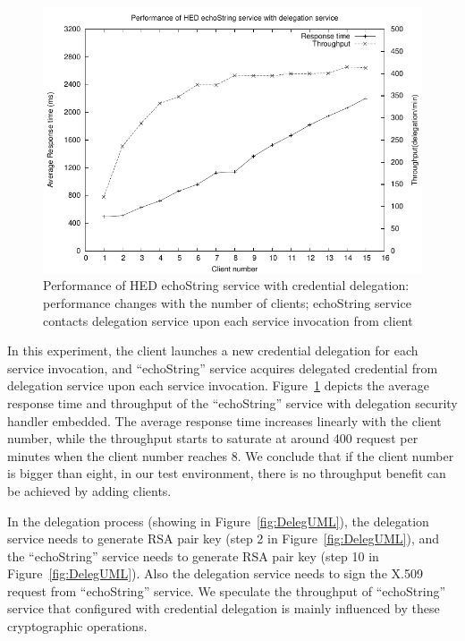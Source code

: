 \documentclass[conference]{IEEEtran}
\begin{document}
\begin{figure}
\includegraphics[width=0.9\columnwidth]{Delegation_thread_to_perf.pdf}
\caption{Performance of HED echoString service with credential delegation:
performance changes with the number of clients; echoString service contacts delegation service upon
each service invocation from client}
\label{fig:Delegation_thread_to_perf}
\end{figure}

In this experiment, the client launches a new credential delegation for each
service invocation, and ``echoString'' service acquires delegated credential from delegation service
upon each service invocation.
Figure~\ref{fig:Delegation_thread_to_perf} depicts the average response time and
throughput of the ``echoString'' service with delegation security handler embedded. The
average response time increases linearly with the client number, while the throughput starts to saturate
at around 400 request per minutes when the client number reaches 8.
We conclude that if the client number is bigger than eight, in our test
environment, there is no throughput benefit can be achieved by adding clients.

In the delegation process (showing in Figure~\ref{fig:DelegUML}), the delegation service needs
to generate RSA pair key (step 2 in Figure~\ref{fig:DelegUML}), and the ``echoString'' service
needs to generate RSA pair key (step 10 in Figure~\ref{fig:DelegUML}). Also the delegation service
needs to sign the X.509 request from ``echoString'' service.
We speculate the throughput of ``echoString'' service that configured with credential delegation
is mainly influenced by these cryptographic operations.


\end{document}

